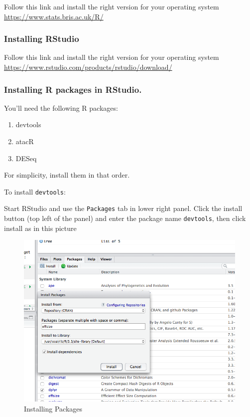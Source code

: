 \documentclass[]{book}
\providecommand{\tightlist}{%
  \setlength{\itemsep}{0pt}\setlength{\parskip}{0pt}}
\begin{document}
Follow this link and install the right version for your operating system \url{https://www.stats.bris.ac.uk/R/}

\hypertarget{installing-rstudio}{%
\subsubsection{Installing RStudio}\label{installing-rstudio}}

Follow this link and install the right version for your operating system \url{https://www.rstudio.com/products/rstudio/download/}

\hypertarget{installing-r-packages-in-rstudio.}{%
\subsubsection{Installing R packages in RStudio.}\label{installing-r-packages-in-rstudio.}}

You'll need the following R packages:

\begin{enumerate}
\def\labelenumi{\arabic{enumi}.}
\tightlist
\item
  devtools
\item
  atacR
\item
  DESeq
\end{enumerate}

For simplicity, install them in that order.

To install \texttt{devtools}:

Start RStudio and use the \texttt{Packages} tab in lower right panel. Click the install button (top left of the panel) and enter the package name \texttt{devtools}, then click install as in this picture

\begin{figure}
\centering
\includegraphics{fig/package_install.png}
\caption{Installing Packages}
\end{figure}
\end{document}
